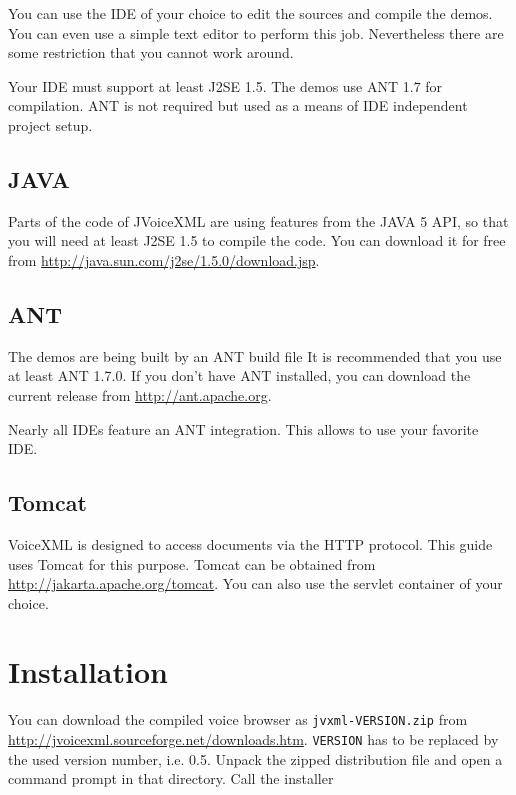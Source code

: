\documentclass[11pt,a4paper]{article}
\begin{document}
You can use the IDE of your choice to edit the sources and compile the 
demos. You can even use a simple text editor to perform this job.
Nevertheless there are some restriction that you cannot work around.

Your IDE must support at least J2SE 1.5. The demos use ANT 1.7 for compilation. 
ANT is not required but used as a means of IDE independent project setup.

\subsection{JAVA}
\label{sec:java}

Parts of the code of JVoiceXML are using features from the JAVA 5 API, so that
you will need at least J2SE 1.5 to compile the code. You can download it
for free from \url{http://java.sun.com/j2se/1.5.0/download.jsp}.

\subsection{ANT}
\label{sec:ant}

The demos are being built by an ANT build file It is recommended that
you use at least ANT 1.7.0. 
If you don't have ANT installed, you can download the current release
from \url{http://ant.apache.org}.

Nearly all IDEs feature an ANT integration. This allows to use
your favorite IDE.

\subsection{Tomcat}
\label{sec:tomcat}

VoiceXML is designed to access documents via the HTTP protocol.
This guide uses Tomcat for this purpose. Tomcat can be obtained
from \url{http://jakarta.apache.org/tomcat}. You can also use
the servlet container of your choice.

\section{Installation}

You can download the compiled voice browser as \texttt{jvxml-VERSION.zip} from 
\url{http://jvoicexml.sourceforge.net/downloads.htm}.
\texttt{VERSION} has to be replaced by the used version number, i.e. 0.5.
Unpack the zipped distribution file and open a command prompt in that
directory. Call the installer 
\end{document}
